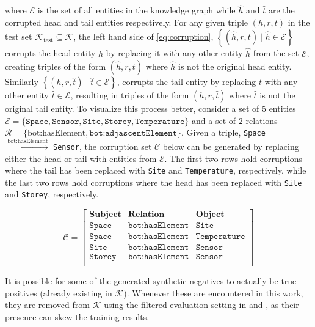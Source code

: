 \noindent where \( \mathcal{E} \) is the set of all entities in the knowledge graph while \( \hat{h} \) and \( \hat{t} \) are the corrupted head and tail entities respectively. For any given triple \( (h, r, t) \) in the test set $\mathcal{K}_{\text{test}} \subseteq \mathcal{K}$, the left hand side of \autoref{eq:corruption}, $\left\{(\hat{h}, r, t) \mid \hat{h} \in \mathcal{E}\right\}$ corrupts the head entity \( h \) by replacing it with any other entity \( \hat{h} \) from the set \( \mathcal{E} \), creating triples of the form \( (\hat{h}, r, t) \) where \( \hat{h} \) is not the original head entity. Similarly $\left\{(h, r, \hat{t}) \mid \hat{t} \in \mathcal{E}\right\}$, corrupts the tail entity by replacing \( t \) with any other entity \(\hat{t} \in \mathcal{E}\), resulting in triples of the form \( (h, r, \hat{t}) \) where \( \hat{t} \) is not the original tail entity. To visualize this process better, consider a set of 5 entities \( \mathcal{E} = \{ \texttt{Space}, \texttt{Sensor}, \texttt{Site}, \texttt{Storey}, \texttt{Temperature} \} \) and a set of 2 relations \( \mathcal{R} = \{ \text{bot:hasElement}, \texttt{bot:adjascentElement} \} \). Given a triple, \texttt{Space} $\xrightarrow{\text{bot:hasElement}}$ \texttt{Sensor}, the corruption set \( \mathcal{C} \) below can be generated by replacing either the head or tail with entities from \( \mathcal{E} \). The first two rows hold corruptions where the tail has been replaced with \texttt{Site} and \texttt{Temperature}, respectively, while the last two rows hold corruptions where the head has been replaced with \texttt{Site} and \texttt{Storey}, respectively. 

\[
\mathcal{C} = 
\left[\begin{array}{ccc}

\textbf{Subject} & \textbf{Relation} & \textbf{Object} \\
\hline
\texttt{Space} & \texttt{bot:hasElement} & \texttt{Site} \\ 
\texttt{Space} & \texttt{bot:hasElement} & \texttt{Temperature} \\ 
\texttt{Site} & \texttt{bot:hasElement} & \texttt{Sensor} \\ 
\texttt{Storey} & \texttt{bot:hasElement} & \texttt{Sensor} \\ 
\end{array}\right]
\]

\noindent It is possible for some of the generated synthetic negatives to actually be true positives (already existing in $\mathcal{K}$). Whenever these are encountered in this work, they are removed from $\mathcal{K}$ using the filtered evaluation setting in \citep{Bordes2013} and \citep{Ali2020BringingFramework}, as their presence can skew the training results. 

